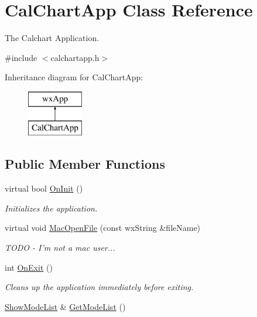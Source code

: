 \hypertarget{a00019}{\section{Cal\-Chart\-App Class Reference}
\label{a00019}
}


The Calchart Application.  




{\ttfamily \#include $<$calchartapp.\-h$>$}

Inheritance diagram for Cal\-Chart\-App\-:\begin{figure}[H]
\begin{center}
\leavevmode
\includegraphics[height=2.000000cm]{a00019}
\end{center}
\end{figure}
\subsection*{Public Member Functions}
\begin{DoxyCompactItemize}
\item 
virtual bool \hyperlink{a00019_a18be3b3d0fad5cca9d071c8db6d535cc}{On\-Init} ()
\begin{DoxyCompactList}\small\item\em Initializes the application. \end{DoxyCompactList}\item 
virtual void \hyperlink{a00019_a0dca14f2ffaf9038c2b11df641d46bd6}{Mac\-Open\-File} (const wx\-String \&file\-Name)
\begin{DoxyCompactList}\small\item\em T\-O\-D\-O -\/ I'm not a mac user... \end{DoxyCompactList}\item 
int \hyperlink{a00019_af5b65edc5a8a3d066f798406cb695a3e}{On\-Exit} ()
\begin{DoxyCompactList}\small\item\em Cleans up the application immediately before exiting. \end{DoxyCompactList}\item 
\hyperlink{a00236_a39f2aa1ac0d2da59ef7f3e58b13f44d2}{Show\-Mode\-List} \& \hyperlink{a00019_ae786827951680706302792f8efff7744}{Get\-Mode\-List} ()
\end{DoxyCompactItemize}
